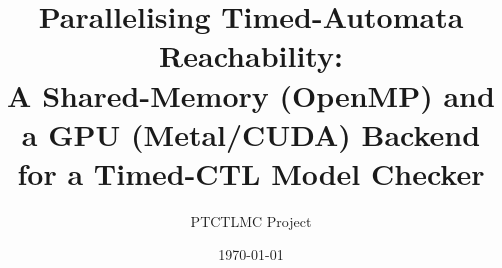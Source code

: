 \title{\bfseries Parallelising Timed-Automata Reachability:\\[2pt]
  \large A Shared-Memory (OpenMP) and a GPU (Metal/CUDA) Backend for a Timed-CTL Model Checker}
\author{PTCTLMC Project}
\date{\today}


\usepackage{multirow}
\usetikzlibrary{patterns}


\providecommand{\Zone}{\mathcal{Z}}
\providecommand{\DBM}[1]{\mathbf{D}_{#1}}
\providecommand{\Passed}{\mathit{Passed}}
\providecommand{\dk}{\mathit{dk}}
\providecommand{\aLU}{\ensuremath{\preceq_{\mathit{LU}}}}
\providecommand{\tool}{\textsc{Ptctlmc}}
\providecommand{\uppaal}{\textsc{Uppaal}}
\providecommand{\ltsmin}{\textsc{LTSmin}}
\providecommand{\opaal}{\textsc{opaal}}
